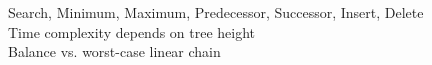 \documentclass[preview]{standalone}
\begin{document}
Search, Minimum, Maximum, Predecessor, Successor, Insert, Delete\\Time complexity depends on tree height\\Balance vs. worst-case linear chain\\
\end{document}
